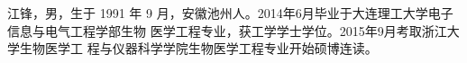 \cleardoublepage
{}
江锋，男，生于 1991 年 9 月，安徽池州人。2014年6月毕业于大连理工大学电子信息与电气工程学部生物
医学工程专业，获工学学士学位。2015年9月考取浙江大学生物医学工
程与仪器科学学院生物医学工程专业开始硕博连读。

